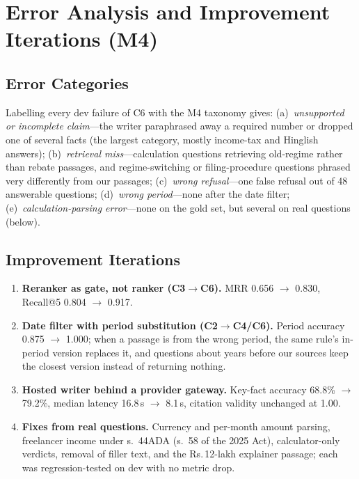 \documentclass[conference]{IEEEtran}
\newcommand{\rupee}{Rs.\,}
\begin{document}
\section{Error Analysis and Improvement Iterations (M4)}

\subsection{Error Categories}
Labelling every dev failure of C6 with the M4 taxonomy gives: (a)~\emph{unsupported or incomplete claim}---the
writer paraphrased away a required number or dropped one of several facts (the largest category, mostly
income-tax and Hinglish answers); (b)~\emph{retrieval miss}---calculation questions retrieving old-regime
rather than rebate passages, and regime-switching or filing-procedure questions phrased very differently
from our passages; (c)~\emph{wrong refusal}---one false refusal out of 48 answerable questions;
(d)~\emph{wrong period}---none after the date filter; (e)~\emph{calculation-parsing error}---none on the gold
set, but several on real questions (below).

\subsection{Improvement Iterations}
\begin{enumerate}
\item \textbf{Reranker as gate, not ranker (C3$\to$C6).} MRR 0.656 $\to$ 0.830, Recall@5 0.804 $\to$ 0.917.
\item \textbf{Date filter with period substitution (C2$\to$C4/C6).} Period accuracy 0.875 $\to$ 1.000; when a
passage is from the wrong period, the same rule's in-period version replaces it, and questions about years
before our sources keep the closest version instead of returning nothing.
\item \textbf{Hosted writer behind a provider gateway.} Key-fact accuracy 68.8\% $\to$ 79.2\%, median latency
16.8\,s $\to$ 8.1\,s, citation validity unchanged at 1.00.
\item \textbf{Fixes from real questions.} Currency and per-month amount parsing, freelancer income under
s.~44ADA (s.~58 of the 2025 Act), calculator-only verdicts, removal of filler text, and the
\rupee12-lakh explainer passage; each was regression-tested on dev with no metric drop.
\end{enumerate}
\end{document}
